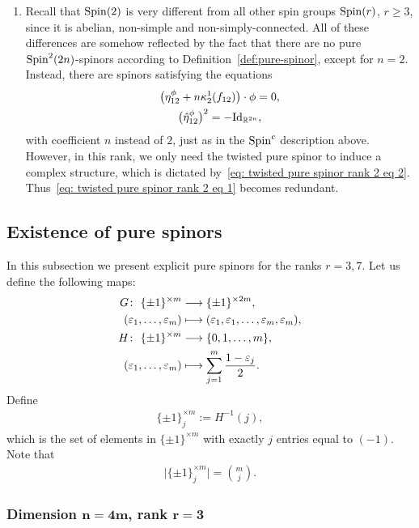 \documentclass[10pt,a4paper]{amsart}
\newcommand{\lra}{\longrightarrow}
\numberwithin{equation}{section}
\begin{document}
\begin{enumerate}
\item Recall that ${\rm Spin}(2)$ is very different from all other spin groups ${\rm Spin}(r)$, $r\geq 3$, since it is abelian, non-simple and non-simply-connected. All of these differences are somehow reflected by the fact that there are no pure ${\rm Spin}^2(2n)$-spinors according to Definition~\ref{def:pure-spinor}, except for $n=2$. Instead, there are spinors satisfying the equations
\begin{gather}
 \big(\eta_{12}^\phi + n \kappa_2^1(f_{12})\big) \cdot\phi = 0,\label{eq: twisted pure spinor rank 2 eq 1}\\
 \big(\hat\eta_{12}^\phi\big)^2 = -{\rm Id}_{\mathbb{R}^{2n}},\label{eq: twisted pure spinor rank 2 eq 2}
\end{gather}
with coefficient $n$ instead of $2$, just as in the ${\rm Spin}^c$ description above. However, in this rank, we only need the twisted pure spinor to induce a complex structure, which is dictated by~\eqref{eq: twisted pure spinor rank 2 eq 2}. Thus~\eqref{eq: twisted pure spinor rank 2 eq 1} becomes redundant.
\end{enumerate}

\subsection{Existence of pure spinors}\label{subsec: existence pure spinors}

In this subsection we present explicit pure spinors for the ranks $r= 3,7$.
Let us define the following maps:
\begin{align*}
 G\colon \ \{\pm 1\}^{\times m} &\lra \{\pm 1\}^{\times 2m},\\
 (\varepsilon_1,\dots,\varepsilon_m) &\longmapsto (\varepsilon_1,\varepsilon_1,\dots,\varepsilon_m,\varepsilon_m),\\
 H\colon \ \{\pm 1\}^{\times m} &\lra \{0,1,\dots,m\},\\
 (\varepsilon_1,\dots,\varepsilon_m) &\longmapsto \sum_{j=1}^m {1-\varepsilon_j\over 2}.
\end{align*}
Define
\begin{gather*}\{\pm1\}_j^{\times m} := H^{-1}(j),\end{gather*}
which is the set of elements in $\{\pm1\}^{\times m}$ with exactly $j$ entries equal to $(-1)$. Note that
\begin{gather*}\big|\{\pm1\}_j^{\times m}\big|={m\choose j}.\end{gather*}

\subsubsection[Dimension $n=4m$, rank $r=3$]{Dimension $\boldsymbol{n=4m}$, rank $\boldsymbol{r=3}$}\label{subsec:QK-pure-spinor}
\end{document}
